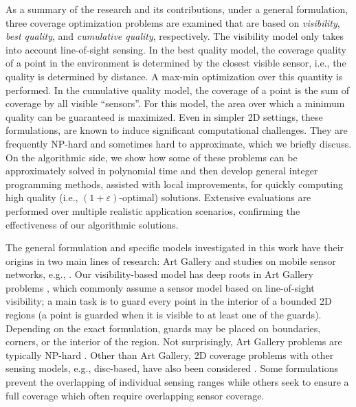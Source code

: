 As a summary of the research and its contributions, under a general formulation, three coverage optimization problems are examined that are based on \emph{visibility}, \emph{best quality}, and \emph{cumulative quality}, respectively. The visibility model only takes into account line-of-sight sensing. In the best quality model, the coverage quality of a point in the environment is determined by the closest visible sensor, i.e., the quality is determined by distance. A max-min optimization over this quantity is performed. In the cumulative quality model, the coverage of a point is the sum of coverage by all visible ``sensors''. For this model, the area over which a minimum quality can be guaranteed is maximized. Even in simpler 2D settings, these formulations, are known to induce significant computational challenges. They are frequently NP-hard and sometimes hard to approximate, which we briefly discuss. On the algorithmic side, we show how some of these problems can be approximately solved in polynomial time and then develop general integer programming methods, assisted with local improvements, for quickly computing high quality (i.e., $(1+\varepsilon)$-optimal) solutions. Extensive evaluations are performed over multiple realistic application scenarios, confirming the effectiveness of our algorithmic solutions. 

The general formulation and specific models investigated in this work have their origins in two main lines of research: Art Gallery \cite{o1987art,shermer1992recent,o2017visibility} and studies on mobile sensor networks, e.g., \cite{howard2002mobile,cortes2004coverage,martinez2007motion,krause2008near,schwager2009decentralized,hollinger2013sampling}. Our visibility-based model has deep roots in Art Gallery problems \cite{o1987art,shermer1992recent,o2017visibility}, which commonly assume a sensor model based on line-of-sight visibility\cite{lozano1979algorithm}; a main task is to guard every point in the interior of a bounded 2D regions (a point is guarded when it is visible to at least one of the guards). Depending on the exact formulation, guards may be placed on boundaries, corners, or the interior of the region. Not surprisingly, Art Gallery problems are typically NP-hard \cite{lee1986computational}. Other than Art Gallery, 2D coverage problems with other sensing models, e.g., disc-based, have also been considered \cite{thue1910dichteste,hales2005proof,drezner1995facility,cortes2004coverage,pavone2009equitable,pierson2017adapting}. Some formulations prevent the overlapping of individual sensing ranges \cite{thue1910dichteste,hales2005proof} while others seek to ensure a full coverage which often require overlapping sensor coverage. 

